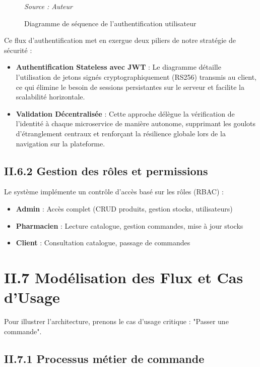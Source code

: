 \begin{figure}[H]
    \centering
    
    \caption{Diagramme de séquence de l'authentification utilisateur}
    \vspace{0.2cm}\small\textit{Source : Auteur}
    \label{fig:sequence_auth}
\end{figure}

Ce flux d'authentification met en exergue deux piliers de notre stratégie de sécurité :
\begin{itemize}
    \item \textbf{Authentification Stateless avec JWT} : Le diagramme détaille l'utilisation de jetons signés cryptographiquement (RS256) transmis au client, ce qui élimine le besoin de sessions persistantes sur le serveur et facilite la scalabilité horizontale.
    \item \textbf{Validation Décentralisée} : Cette approche délègue la vérification de l'identité à chaque microservice de manière autonome, supprimant les goulots d'étranglement centraux et renforçant la résilience globale lors de la navigation sur la plateforme.
\end{itemize}


\subsection{II.6.2 Gestion des rôles et permissions}

Le système implémente un contrôle d'accès basé sur les rôles (RBAC) :
\begin{itemize}
    \item \textbf{Admin} : Accès complet (CRUD produits, gestion stocks, utilisateurs)
    \item \textbf{Pharmacien} : Lecture catalogue, gestion commandes, mise à jour stocks
    \item \textbf{Client} : Consultation catalogue, passage de commandes
\end{itemize}

\section{II.7 Modélisation des Flux et Cas d'Usage}
\label{sec:use_cases}

Pour illustrer l'architecture, prenons le cas d'usage critique : "Passer une commande".

\subsection{II.7.1 Processus métier de commande}

